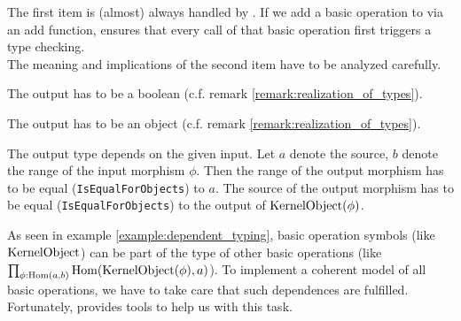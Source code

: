 The first item is (almost) always handled by \CapPkg.
If we add a basic operation to \CapPkg via an add function, \CapPkg ensures that every call of that
basic operation first triggers a type checking.
\\
The meaning and implications of the second item have to be analyzed carefully.
\begin{example}
 The output has to be a boolean (c.f. remark \ref{remark:realization_of_types}).
\end{example}

\begin{example}
 The output has to be an object (c.f. remark \ref{remark:realization_of_types}).
\end{example}

\begin{example}[\ref{example:dependent_typing}]
 The output type depends on the given input. Let $a$ denote the source, $b$ denote the range of the input morphism $\phi$.
 Then the range of the output morphism has to be equal (\texttt{IsEqualForObjects}) to $a$.
 The source of the output morphism has to be equal (\texttt{IsEqualForObjects}) to the output of $\mathrm{KernelObject}(\phi)$.
\end{example}

As seen in example \ref{example:dependent_typing}, basic operation symbols (like $\mathrm{KernelObject}$) can be part of
the type of other basic operations (like $\prod_{\phi: \operatorname{\mathrm{Hom}}(a,b)} \operatorname{\mathrm{Hom}}( \mathrm{KernelObject}(\phi), a )$).
To implement a coherent model of all basic operations, we have to take care that such dependences are fulfilled.
Fortunately, \CapPkg provides tools to help us with this task.

